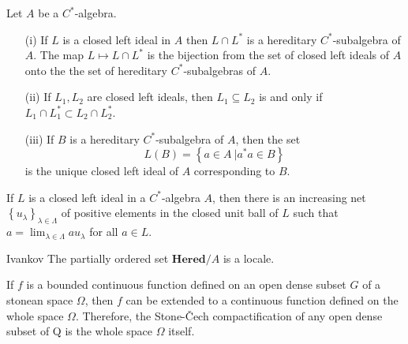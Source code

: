 \documentclass{beamer}
\theoremstyle{plain}
\newcommand{\be}{\begin{equation}}
\newcommand{\ee}{\end{equation}}
\newcommand{\Om}{\Omega}
\newcommand{\la}{\lambda}
\newcommand{\La}{\Lambda}
\begin{document}
\begin{frame}
	\begin{lemma}\label{hered_ideal_lem}
	Let $A$ be a $C^*$-algebra.
	\begin{enumerate}
		\item[(i)] If $L$ is a closed left ideal in $A$ then $L\cap L^*$ is a hereditary $C^*$-subalgebra of $A$. The map $L \mapsto L\cap L^*$ is the bijection from the set of closed left ideals of $A$ onto the the set of hereditary $C^*$-subalgebras of $A$.
		\item[(ii)] If $L_1, L_2$ are closed left ideals, then $L_1 \subseteq L_2$ is and only if $L_1\cap L_1^* \subset L_2\cap L_2^*$.
		\item[(iii)] If $B$ is a hereditary $C^*$-subalgebra of $A$, then the set 
		\be\label{left_ideal_eqn}
		L\left(B \right) = \left\{\left.a \in A~\right| a^*a \in B\right\}
		\ee
		is the unique closed left ideal of $A$ corresponding to $B$.
	\end{enumerate}
\end{lemma}

\end{frame}
\begin{frame}
		\begin{theorem}\label{left_ideal_thm}
		If $L$ is a closed left ideal in a $C^*$-algebra $A$, then there
		is an increasing net $\left\{u_\la\right\}_{\la\in\La}$ of positive elements in the closed unit ball of
		$L$ such that $a = \lim_{\la\in \La}au_\la $ for all $a\in L$.
	\end{theorem}
\begin{lemma}\alert{Ivankov}
	The partially ordered set  $\mathbf{Hered}/A$ is a locale.
\end{lemma}
	
\end{frame}



\begin{frame}
\begin{lemma}
If $f$ is a bounded continuous function defined on an open dense 
subset $G$ of a stonean space $\Om$, then $f$ can be extended to a continuous function 
defined on the whole space $\Om$. Therefore, the Stone-\v{C}ech compactification 
of any open dense subset of Q is the whole space $\Om$ itself. 
\end{lemma}


\end{frame}
\end{document}
